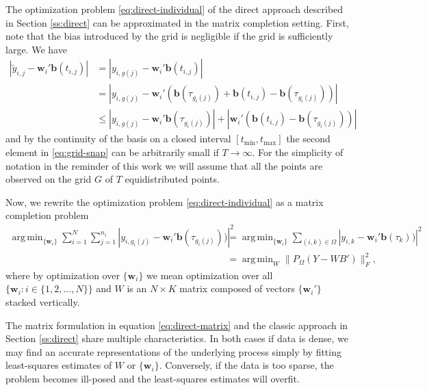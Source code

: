 \documentclass[preprint]{imsart}
\numberwithin{equation}{section}
\theoremstyle{plain}
\newcommand{\bb}{\mathbf{b}}
\newcommand{\bw}{\mathbf{w}}
\DeclareMathOperator*{\argmin}{arg\,min}
\begin{document}
The optimization problem \eqref{eq:direct-individual} of the direct approach described in Section \ref{ss:direct} can be approximated in the matrix completion setting. First, note that the bias introduced by the grid is negligible if the grid is sufficiently large. We have
\begin{align}
  \left|\tilde y_{i,j} - \bw_i'\bb(t_{i,j})\right| &= \left|y_{i,g(j)} - \bw_i'\bb(t_{i,j})\right|\nonumber\\
  &= \left| y_{i,g(j)} - \bw_i' (\bb (\tau_{g_i(j)}) + \bb (t_{i,j}) - \bb (\tau_{g_i(j)}))\right|\nonumber\\
  &\leq \left| y_{i,g(j)} - \bw_i' \bb(\tau_{g_i(j)})\right| + \left|\bw_i' (\bb(t_{i,j}) - \bb(\tau_{g_i(j)}))\right|\label{eq:grid-snap}
\end{align}
and by the continuity of the basis on a closed interval $[t_{\min},t_{\max}]$ the second element in \eqref{eq:grid-snap} can be arbitrarily small if $T \rightarrow \infty$. For the simplicity of notation in the reminder of this work we will assume that all the points are observed on the grid $G$ of $T$ equidistributed points. 

Now, we rewrite the optimization problem \eqref{eq:direct-individual} as a matrix completion problem
\begin{align}
 \argmin_{\{\bw_i\}}\sum_{i=1}^N \sum_{j=1}^{n_i}\left|y_{i,g_i(j)} - \bw_i' \bb(\tau_{g_i(j)}))\right|^2 &= \argmin_{\{\bw_i\}}\sum_{(i,k) \in \Omega}\left|y_{i,k} - \bw_i' \bb(\tau_{k}))\right|^2\nonumber\\
&= \argmin_W \| P_\Omega(Y - WB') \|_F^2,\label{eq:direct-matrix}
\end{align}
where by optimization over $\{\bw_i\}$ we mean optimization over all $\{\bw_i : i \in \{ 1,2,...,N \}\}$ and $W$ is an $N \times K$ matrix composed of vectors $\{\bw_i'\}$ stacked vertically.

The matrix formulation in equation \eqref{eq:direct-matrix} and the classic approach in Section \ref{ss:direct} share multiple characteristics. In both cases if data is dense, we may find an accurate representations of the underlying process simply by fitting least-squares estimates of $W$ or $\{\bw_i\}$. Conversely, if the data is too sparse, the problem becomes ill-posed and the least-squares estimates will overfit. %
\end{document}

